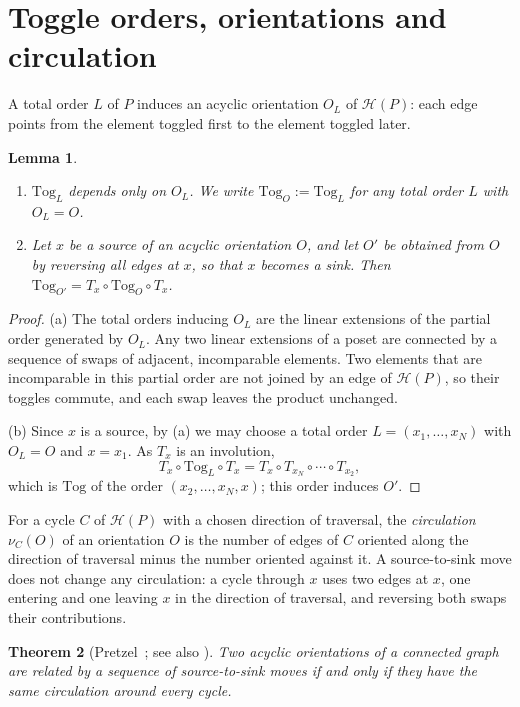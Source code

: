 \documentclass[11pt]{amsart}
\newtheorem{theorem}{Theorem}[section]
\newtheorem{lemma}[theorem]{Lemma}
\theoremstyle{definition}
\newcommand{\Tog}{\mathrm{Tog}}
\newcommand{\Hasse}{\mathcal H}
\begin{document}
\section{Toggle orders, orientations and circulation}\label{sec:orient}
A total order $L$ of $P$ induces an acyclic orientation $O_L$ of $\Hasse(P)$: each edge points from the element toggled first to the element toggled later.

\begin{lemma}\label{lem:orient}
\begin{enumerate}
\item[(a)] $\Tog_L$ depends only on $O_L$. We write $\Tog_O:=\Tog_L$ for any total order $L$ with $O_L=O$.
\item[(b)] Let $x$ be a source of an acyclic orientation $O$, and let $O'$ be obtained from $O$ by reversing all edges at $x$, so that $x$ becomes a sink. Then $\Tog_{O'}=T_x\circ\Tog_{O}\circ T_x$.
\end{enumerate}
\end{lemma}

\begin{proof}
(a) The total orders inducing $O_L$ are the linear extensions of the partial order generated by $O_L$. Any two linear extensions of a poset are connected by a sequence of swaps of adjacent, incomparable elements. Two elements that are incomparable in this partial order are not joined by an edge of $\Hasse(P)$, so their toggles commute, and each swap leaves the product unchanged.

(b) Since $x$ is a source, by (a) we may choose a total order $L=(x_1,\dots,x_N)$ with $O_L=O$ and $x=x_1$. As $T_x$ is an involution,
\[T_x\circ\Tog_L\circ T_x=T_x\circ T_{x_N}\circ\cdots\circ T_{x_2},\]
which is $\Tog$ of the order $(x_2,\dots,x_N,x)$; this order induces $O'$.
\end{proof}

For a cycle $C$ of $\Hasse(P)$ with a chosen direction of traversal, the \emph{circulation} $\nu_C(O)$ of an orientation $O$ is the number of edges of $C$ oriented along the direction of traversal minus the number oriented against it. A source-to-sink move does not change any circulation: a cycle through $x$ uses two edges at $x$, one entering and one leaving $x$ in the direction of traversal, and reversing both swaps their contributions.

\begin{theorem}[Pretzel~\cite{Pretzel}; see also {\cite[Prop.~4.4]{DMR}}]\label{thm:pretzel}
Two acyclic orientations of a connected graph are related by a sequence of source-to-sink moves if and only if they have the same circulation around every cycle.
\end{theorem}
\end{document}
